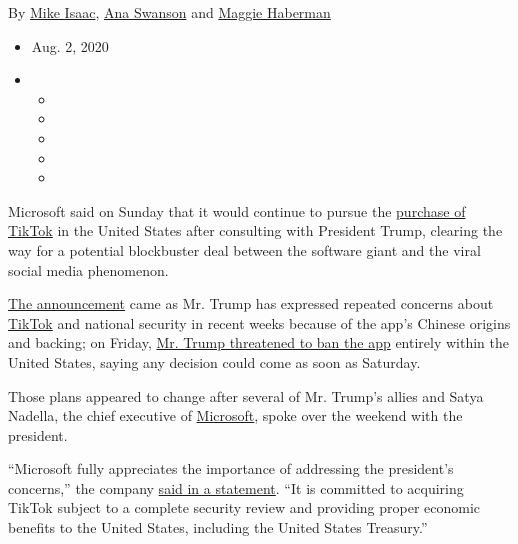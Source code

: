 By \href{https://www.nytimes.com/by/mike-isaac}{Mike Isaac},
\href{https://www.nytimes.com/by/ana-swanson}{Ana Swanson} and
\href{https://www.nytimes.com/by/maggie-haberman}{Maggie Haberman}

\begin{itemize}
\item
  Aug. 2, 2020
\item
  \begin{itemize}
  \item
  \item
  \item
  \item
  \item
  \end{itemize}
\end{itemize}

Microsoft said on Sunday that it would continue to pursue the
\href{https://www.nytimes.com/2020/08/03/technology/tiktok-microsoft-tweens.html}{purchase
of TikTok} in the United States after consulting with President Trump,
clearing the way for a potential blockbuster deal between the software
giant and the viral social media phenomenon.

\href{https://blogs.microsoft.com/blog/2020/08/02/microsoft-to-continue-discussions-on-potential-tiktok-purchase-in-the-united-states/}{The
announcement} came as Mr. Trump has expressed repeated concerns about
\href{https://www.nytimes.com/2020/08/03/technology/trump-tiktok-microsoft.html}{TikTok}
and national security in recent weeks because of the app's Chinese
origins and backing; on Friday,
\href{https://www.nytimes.com/2020/08/02/style/tiktok-ban-threat-trump.html}{Mr.
Trump threatened to ban the app} entirely within the United States,
saying any decision could come as soon as Saturday.

Those plans appeared to change after several of Mr. Trump's allies and
Satya Nadella, the chief executive of
\href{https://www.nytimes.com/2020/08/03/us/navy-seal-museum-kaepernick.html}{Microsoft},
spoke over the weekend with the president.

``Microsoft fully appreciates the importance of addressing the
president's concerns,'' the company
\href{https://blogs.microsoft.com/blog/2020/08/02/microsoft-to-continue-discussions-on-potential-tiktok-purchase-in-the-united-states/}{said
in a statement}. ``It is committed to acquiring TikTok subject to a
complete security review and providing proper economic benefits to the
United States, including the United States Treasury.''

